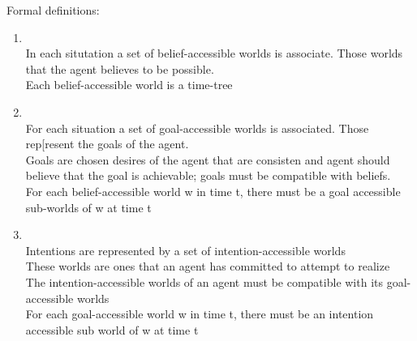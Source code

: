 Formal definitions:
\begin{enumerate}
\item {}\\
In each situtation a set of belief-accessible worlds is associate. Those worlds that the agent believes to be possible.\\
Each belief-accessible world is a time-tree
\item {}\\
For each situation a set of goal-accessible worlds is associated. Those rep[resent the goals of the agent.\\
Goals are chosen desires of the agent that are consisten and agent should believe that the goal is achievable; goals must be compatible with beliefs.\\
For each belief-accessible world w in time t, there must be a goal accessible sub-worlds of w at time t
\item {}\\
Intentions are represented by a set of intention-accessible worlds\\
These worlds are ones that an agent has committed to attempt to realize\\
The intention-accessible worlds of an agent must be compatible with its goal-accessible worlds\\
For each goal-accessible world w in time t, there must be an intention accessible sub world of w at time t
\end{enumerate}

